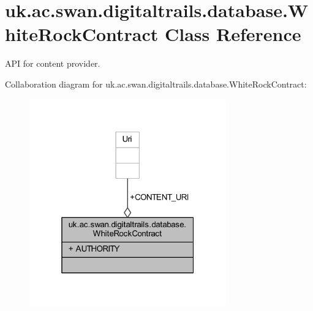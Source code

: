 \hypertarget{classuk_1_1ac_1_1swan_1_1digitaltrails_1_1database_1_1_white_rock_contract}{\section{uk.\+ac.\+swan.\+digitaltrails.\+database.\+White\+Rock\+Contract Class Reference}
\label{classuk_1_1ac_1_1swan_1_1digitaltrails_1_1database_1_1_white_rock_contract}
}


A\+P\+I for content provider.  




Collaboration diagram for uk.\+ac.\+swan.\+digitaltrails.\+database.\+White\+Rock\+Contract\+:
\nopagebreak
\begin{figure}[H]
\begin{center}
\leavevmode
\includegraphics[width=241pt]{classuk_1_1ac_1_1swan_1_1digitaltrails_1_1database_1_1_white_rock_contract__coll__graph}
\end{center}
\end{figure}
